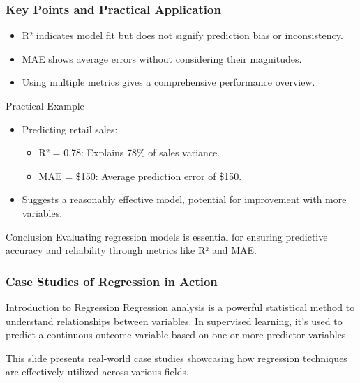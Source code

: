\documentclass[aspectratio=169]{beamer}
\begin{document}
\begin{frame}[fragile]
    \frametitle{Key Points and Practical Application}
    \begin{itemize}
        \item R² indicates model fit but does not signify prediction bias or inconsistency.
        \item MAE shows average errors without considering their magnitudes.
        \item Using multiple metrics gives a comprehensive performance overview.
    \end{itemize}

    \begin{block}{Practical Example}
        \begin{itemize}
            \item Predicting retail sales:
            \begin{itemize}
                \item R² = 0.78: Explains 78\% of sales variance.
                \item MAE = \$150: Average prediction error of \$150.
            \end{itemize}
            \item Suggests a reasonably effective model, potential for improvement with more variables.
        \end{itemize}
    \end{block}

    \begin{block}{Conclusion}
        Evaluating regression models is essential for ensuring predictive accuracy and reliability through metrics like R² and MAE.
    \end{block}
\end{frame}

\begin{frame}[fragile]
    \frametitle{Case Studies of Regression in Action}
    \begin{block}{Introduction to Regression}
        Regression analysis is a powerful statistical method to understand relationships between variables. In supervised learning, it's used to predict a continuous outcome variable based on one or more predictor variables.
    \end{block}
    This slide presents real-world case studies showcasing how regression techniques are effectively utilized across various fields.
\end{frame}
\end{document}
